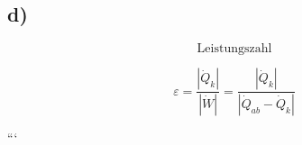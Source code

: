 

\subsection*{d)}

\[
\text{Leistungszahl}
\]

\[
\varepsilon = \frac{|\dot{Q}_k|}{|\dot{W}|} = \frac{|\dot{Q}_k|}{|\dot{Q}_{ab} - \dot{Q}_k|}
\]

```